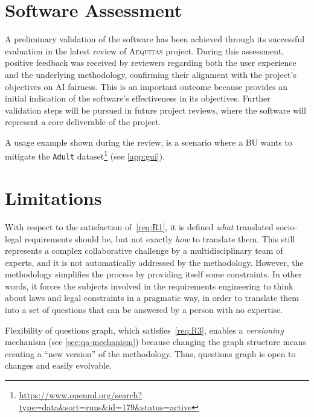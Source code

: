 \documentclass[12pt,a4paper,openright,twoside]{book}
\newcommand{\aequitas}{\textsc{Aequitas}}
\begin{document}
\section{Software Assessment}

A preliminary validation of the software has been achieved through its successful evaluation in the latest review of \aequitas{} project.
%
During this assessment, positive feedback was received by reviewers regarding both the user experience and the underlying methodology, confirming their alignment with the project’s objectives on \ac{AI} fairness.
%
This is an important outcome because provides an initial indication of the software’s effectiveness in its objectives.
%
Further validation steps will be pursued in future project reviews, where the software will represent a core deliverable of the project.

A usage example shown during the review, is a scenario where a \ac{BU} wants to mitigate the \texttt{Adult} dataset\footnote{\url{https://www.openml.org/search?type=data\&sort=runs\&id=179\&status=active}} (see \cref{app:gui}).


\section{Limitations}

With respect to the satisfaction of~\ref{req:R1}, it is defined \textit{what} translated socio-legal requirements should be, but not exactly \textit{how} to translate them.
%
This still represents a complex collaborative challenge by a multidisciplinary team of experts, and it is not automatically addressed by the methodology.
%
However, the methodology simplifies the process by providing itself some constraints.
%
In other words, it forces the subjects involved in the requirements engineering to think about laws and legal constraints in a pragmatic way, in order to translate them into a set of questions that can be answered by a person with no expertise.


Flexibility of questions graph, which satisfies~\ref{req:R3}, enables a \textit{versioning} mechanism (see \cref{sec:qa-mechanism}) because changing the graph structure means creating a ``new version'' of the methodology.
%
Thus, questions graph is open to changes and easily evolvable.
\end{document}
